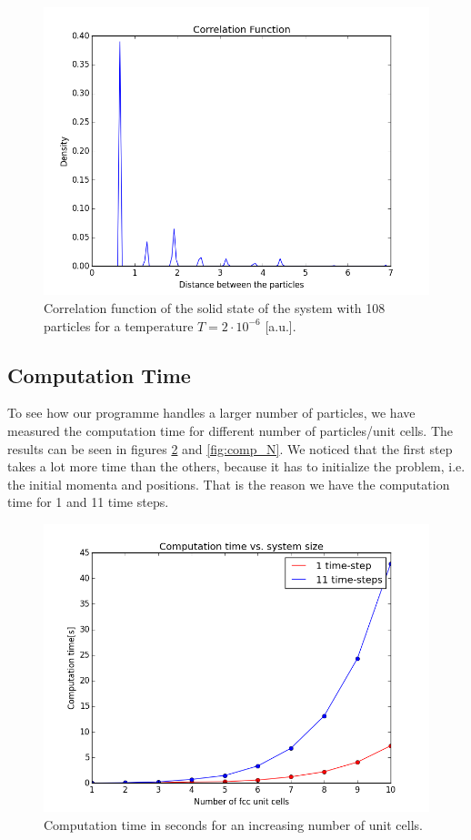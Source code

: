 \documentclass[a4paper,twoside,12pt]{article}
\begin{document}
\begin{figure}
\centering
\includegraphics[scale=0.6]{figures/Corr_func_solid_2e-6.png}
\caption{Correlation function of the solid state of the system with 108 particles for a temperature $T=2 \cdot 10^{-6}$ [a.u.].}
\label{fig:cor_solid}
\end{figure}

\subsection{Computation Time}
\noindent To see how our programme handles a larger number of particles, we have measured the computation time for different number of particles/unit cells. The results can be seen in figures \ref{fig:comp_A} and \ref{fig:comp_N}. We noticed that the first step takes a lot more time than the others, because it has to initialize the problem, i.e. the initial momenta and positions. That is the reason we have the computation time for 1 and 11 time steps. 

\begin{figure}
\centering
\includegraphics[scale=0.6]{figures/computationtime_unitcells}
\caption{Computation time in seconds for an increasing number of unit cells.}
\label{fig:comp_A}
\end{figure}
\end{document}
